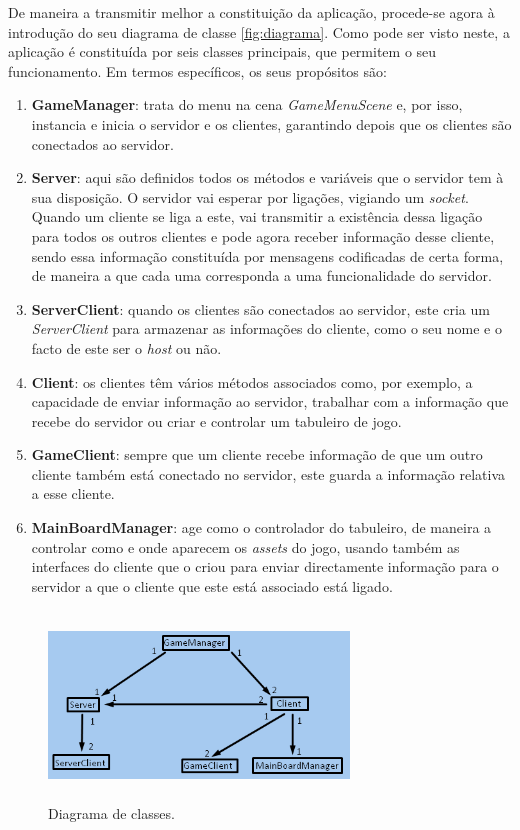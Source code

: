 De maneira a transmitir melhor a constituição da aplicação, procede-se agora à introdução do seu diagrama de classe \autoref{fig:diagrama}. Como pode ser visto neste, a aplicação é constituída por seis classes principais, que permitem o seu funcionamento. Em termos específicos, os seus propósitos são:
\begin{enumerate}
    \item \textbf{GameManager}: trata do menu na cena \emph{GameMenuScene} e, por isso, instancia e inicia o servidor e os clientes, garantindo depois que os clientes são conectados ao servidor.
    \item \textbf{Server}: aqui são definidos todos os métodos e variáveis que o servidor tem à sua disposição. O servidor vai esperar por ligações, vigiando um \textit{socket}. Quando um cliente se liga a este, vai transmitir a existência dessa ligação para todos os outros clientes e pode agora receber informação desse cliente, sendo essa informação constituída por mensagens codificadas de certa forma, de maneira a que cada uma corresponda a uma funcionalidade do servidor.
    \item \textbf{ServerClient}: quando os clientes são conectados ao servidor, este cria um \textit{ServerClient} para armazenar as informações do cliente, como o seu nome e o facto de este ser o \emph{host} ou não.
    \item \textbf{Client}: os clientes têm vários métodos associados como, por exemplo, a capacidade de enviar informação ao servidor, trabalhar com a informação que recebe do servidor ou criar e controlar um tabuleiro de jogo.
    \item \textbf{GameClient}: sempre que um cliente recebe informação de que um outro cliente também está conectado no servidor, este guarda a informação relativa a esse cliente.
    \item \textbf{MainBoardManager}: age como o controlador do tabuleiro, de maneira a controlar como e onde aparecem os \textit{assets} do jogo, usando também as interfaces do cliente que o criou para enviar directamente informação para o servidor a que o cliente que este está associado está ligado.
\end{enumerate}

\begin{figure}[!h]
    \includegraphics[width=8cm, height=5cm]{Screenshot_1.png}
    \centering
    \caption{Diagrama de classes.}
    \label{fig:diagrama}
\end{figure}

